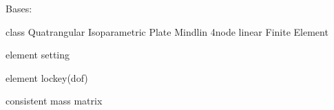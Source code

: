 \documentclass[letterpaper,10pt,english]{sphinxmanual}
\begin{document}
\begin{fulllineitems}
\label{\detokenize{myfempy.felib.struct:myfempy.felib.struct.plate41.Plate41}}
\pysigstartsignatures
{}
\pysigstopsignatures
\sphinxAtStartPar
Bases: 

\sphinxAtStartPar
class Quatrangular Isoparametric Plate Mindlin 4\sphinxhyphen{}node linear Finite Element

\begin{fulllineitems}
\label{\detokenize{myfempy.felib.struct:myfempy.felib.struct.plate41.Plate41.elemset}}
\pysigstartsignatures
{}
\pysigstopsignatures
\sphinxAtStartPar
element setting

\end{fulllineitems}


\begin{fulllineitems}
\label{\detokenize{myfempy.felib.struct:myfempy.felib.struct.plate41.Plate41.lockey}}
\pysigstartsignatures
{}
\pysigstopsignatures
\sphinxAtStartPar
element lockey(dof)

\end{fulllineitems}


\begin{fulllineitems}
\label{\detokenize{myfempy.felib.struct:myfempy.felib.struct.plate41.Plate41.mass}}
\pysigstartsignatures
{}
\pysigstopsignatures
\sphinxAtStartPar
consistent mass matrix

\end{fulllineitems}


\end{fulllineitems}
\end{document}
